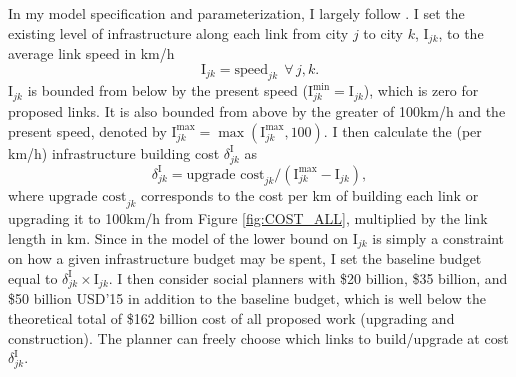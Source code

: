 \documentclass[a4paper]{article}
\begin{document}
In my model specification and parameterization, I largely follow \citet{graff2019spatial}. I set the existing level of infrastructure along each link from city $j$ to city $k$, $\text{I}_{jk}$, to the average link speed in km/h
\begin{equation}
\text{I}_{jk} = \text{speed}_{jk} \ \ \forall\, j,k.
\end{equation}
$\text{I}_{jk}$ is bounded from below by the present speed ($\text{I}^\text{min}_{jk} = \text{I}_{jk}$), which is zero for proposed links. It is also bounded from above by the greater of 100km/h and the present speed, denoted by $\text{I}^\text{max}_{jk} = \max(\text{I}^\text{max}_{jk}, 100)$. I then calculate the (per km/h) infrastructure building cost $\delta^\text{I}_{jk}$ as
\begin{equation}
\delta^\text{I}_{jk} = \text{upgrade cost}_{jk} / (\text{I}^\text{max}_{jk} - \text{I}_{jk}),
\end{equation}
where $\text{upgrade cost}_{jk}$ corresponds to the cost per km of building each link or upgrading it to 100km/h from Figure \ref{fig:COST_ALL}, multiplied by the link length in km. Since in the model of \citet{fajgelbaum2020optimal} the lower bound on $\text{I}_{jk}$ is simply a constraint on how a given infrastructure budget may be spent, I set the baseline budget equal to $\delta^\text{I}_{jk} \times \text{I}_{jk}$. I then consider social planners with \$20 billion, \$35 billion, and \$50 billion USD'15 in addition to the baseline budget, which is well below the theoretical total of \$162 billion cost of all proposed work (upgrading and construction). The planner can freely choose which links to build/upgrade at cost $\delta^\text{I}_{jk} $. \newline
\end{document}
